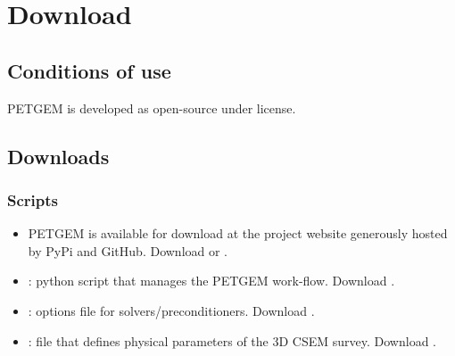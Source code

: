 \documentclass[letterpaper,10pt,english]{sphinxmanual}
\begin{document}
\chapter{Download}
\label{\detokenize{Download:download}}\label{\detokenize{Download:id1}}\label{\detokenize{Download::doc}}

\section{Conditions of use}
\label{\detokenize{Download:conditions-of-use}}\label{\detokenize{Download:id2}}
PETGEM is developed as open-source under
 license.


\section{Downloads}
\label{\detokenize{Download:downloads}}\label{\detokenize{Download:download-petgem}}

\subsection{Scripts}
\label{\detokenize{Download:scripts}}\begin{itemize}
\item {} 
PETGEM is available for download at the project website generously hosted by PyPi and GitHub. Download  or .

\item {} 
: python script that manages the PETGEM work-flow. Download .

\item {} 
: options file for  solvers/preconditioners. Download .

\item {} 
: file that defines physical parameters of the 3D CSEM survey. Download .

\end{itemize}
\end{document}
